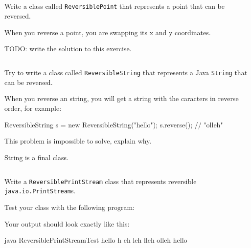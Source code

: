 \documentclass[a4paper, 11pt]{article}
\begin{document}
\subsection{}

Write a class called \texttt{ReversiblePoint} that represents a point that can
be reversed.

When you reverse a point, you are swapping its x and y coordinates.

\begin{solution}
TODO: write the solution to this exercise.
\end{solution}

\subsection{}

Try to write a class called \texttt{ReversibleString} that represents a Java
\texttt{String} that can be reversed.

When you reverse an string, you will get a string with the caracters in reverse
order, for example:

\begin{blackboard}
ReversibleString s = new ReversibleString("hello");
s.reverse(); // "olleh"
\end{blackboard}

This problem is impossible to solve, explain why.

\begin{solution}
String is a final class.
\end{solution}

\subsection{}

Write a \texttt{ReversiblePrintStream} class that represents reversible \texttt{java.io.PrintStream}s.

Test your class with the following program:


Your output should look exactly like this:

\begin{cmd}
 java ReversiblePrintStreamTest
 hello
 h
 eh
 leh
 lleh
 olleh
 hello
 \end{cmd}

\end{document}
